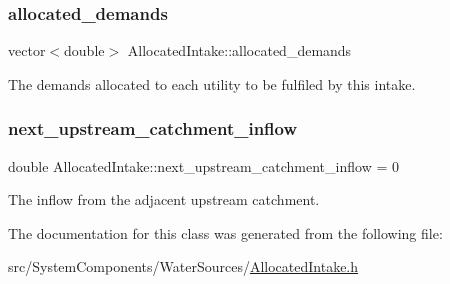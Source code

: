 \subsubsection{\texorpdfstring{allocated\+\_\+demands}{allocated\_demands}}
{\footnotesize\ttfamily vector$<$double$>$ Allocated\+Intake\+::allocated\+\_\+demands}



The demands allocated to each utility to be fulfiled by this intake. 

\mbox{\label{classAllocatedIntake_acf0824f3602cf6e9aa5c4423cb04f078}} 
\subsubsection{\texorpdfstring{next\+\_\+upstream\+\_\+catchment\+\_\+inflow}{next\_upstream\_catchment\_inflow}}
{\footnotesize\ttfamily double Allocated\+Intake\+::next\+\_\+upstream\+\_\+catchment\+\_\+inflow = 0}



The inflow from the adjacent upstream catchment. 



The documentation for this class was generated from the following file\+:\begin{DoxyCompactItemize}
\item 
src/\+System\+Components/\+Water\+Sources/\mbox{\hyperlink{AllocatedIntake_8h}{Allocated\+Intake.\+h}}\end{DoxyCompactItemize}
